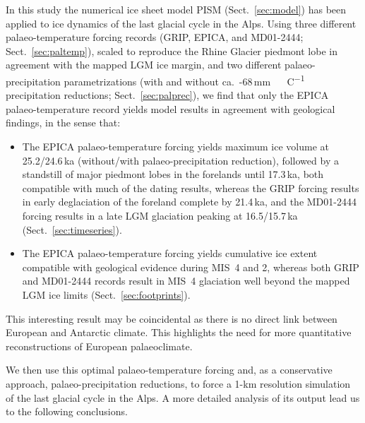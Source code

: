 \documentclass[tc, manuscript]{copernicus}
\begin{document}
\conclusions

    In this study the numerical ice sheet model PISM (Sect.~\ref{sec:model})
    has been applied to ice dynamics of the last glacial cycle in the Alps.
    Using three different palaeo-temperature forcing records (GRIP, EPICA, and
    MD01-2444; Sect.~\ref{sec:paltemp}), scaled to reproduce the Rhine Glacier
    piedmont lobe in agreement with the mapped LGM ice margin, and two
    different palaeo-precipitation parametrizations (with and without
    ca.~-68\,\unit{mm\,{\degree}C^{-1}}
    precipitation reductions; Sect.~\ref{sec:palprec}), we find that only the
    EPICA palaeo-temperature record yields model results in agreement with
    geological findings, in the sense that:

    \begin{itemize}
      \item The EPICA palaeo-temperature forcing yields maximum ice volume at
            25.2/24.6\,ka (without/with palaeo-precipitation reduction),
            followed by a standstill of major piedmont lobes in the forelands
            until 17.3\,ka, both compatible with much of the dating results,
            whereas the GRIP forcing results in early deglaciation of the
            foreland complete by 21.4\,ka, and the MD01-2444 forcing results in
            a late LGM glaciation peaking at 16.5/15.7\,ka
            (Sect.~\ref{sec:timeseries}).
      \item The EPICA palaeo-temperature forcing yields cumulative ice extent
            compatible with geological evidence during MIS~4 and 2, whereas
            both GRIP and MD01-2444 records result in MIS~4 glaciation well
            beyond the mapped LGM ice limits (Sect.~\ref{sec:footprints}).
    \end{itemize}

    This interesting result may be coincidental as there is no direct link
    between European and Antarctic climate. This highlights the need for more
    quantitative reconstructions of European palaeoclimate.

    We then use this optimal palaeo-temperature forcing and, as a conservative
    approach, palaeo-precipitation reductions, to force a 1-km resolution
    simulation of the last glacial cycle in the Alps. A more detailed analysis
    of its output lead us to the following conclusions.
\end{document}
